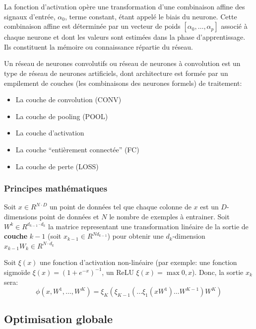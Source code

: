 \documentclass[
  12pt,
  dvipsnames]{article}
\providecommand{\tightlist}{%
  \setlength{\itemsep}{0pt}\setlength{\parskip}{0pt}}
\begin{document}
La fonction d'activation opère une transformation d'une combinaison affine
des signaux d'entrée, \(\alpha_{0}\), terme constant, étant appelé le biais du neurone.
Cette combinaison affine est déterminée par un vecteur de poids \([\alpha_{0},\dots,\alpha_{p}]\) associé à chaque neurone et dont les valeurs sont estimées dans la phase d'apprentissage.
Ils constituent la mémoire ou connaissance répartie du réseau.

Un réseau de neurones convolutifs ou réseau de neurones à convolution
est un type de réseau de neurones artificiels, dont architecture est formée par
un empilement de couches (les combinaisons des neurones formels) de traitement:

\begin{itemize}
\tightlist
\item
  La couche de convolution (CONV)
\item
  La couche de pooling (POOL)
\item
  La couche d'activation
\item
  La couche ``entièrement connectée'' (FC)
\item
  La couche de perte (LOSS)
\end{itemize}

\hypertarget{principes-mathuxe9matiques}{%
\subsubsection{Principes mathématiques}\label{principes-mathuxe9matiques}}

Soit \(x \in R^{N \cdot D}\) un point de données tel que chaque colonne de \(x\) est un \(D\)-dimensions point de données et \(N\) le nombre de exemples à entrainer. Soit \(W^k \in R^{d_{k-1} \cdot d_k}\) la matrice representant une transformation linéaire de la sortie de \textbf{couche} \(k-1\) (soit \(x_{k-1} \in R ^{Nd_{k-1}}\)) pour obtenir une \(d_k\)-dimension \(x_{k-1}W_{k} \in R^{N \cdot d_{k}}\)

Soit \(\xi(x)\) une fonction d'activation non-linéaire (par exemple: une fonction sigmoïde \(\xi(x) = (1+e^{-x})^{-1}\), un ReLU \(\xi(x) = \max{0,x}\)). Donc, la sortie \(x_k\) sera:
\[\phi (x, W^1, \dots, W^K)=\xi_K(\xi_{K-1}(\dots \xi_1(xW^1)\dots W^{K-1})W^K)\]

\hypertarget{optimisation-globale}{%
\subsection{Optimisation globale}\label{optimisation-globale}}
\end{document}
